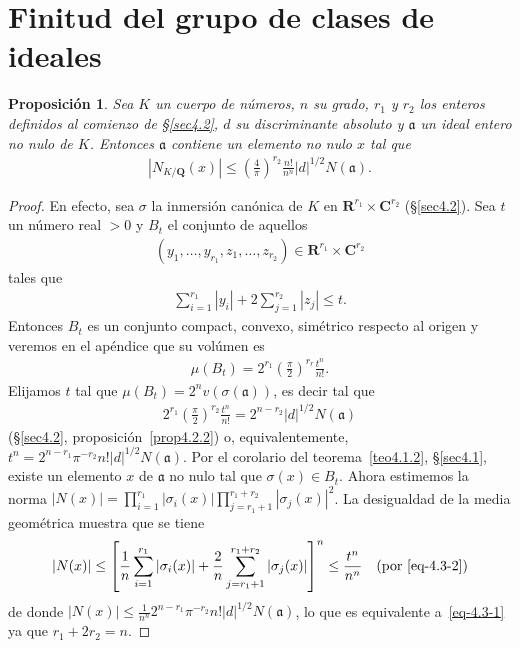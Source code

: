 \documentclass[oneside,bibtotoc,leqno,spanish]{amsbook}
\newcommand{\RR}{\mathbf{R}}
\newcommand{\QQ}{\mathbf{Q}}
\newcommand{\CC}{\mathbf{C}}
\newcommand{\idl}[1]{\mathfrak{#1}}
\newcommand{\QED}{}%
\newcommand{\abs}[1]{\left\lvert#1\right\rvert}
\numberwithin{equation}{section}
\theoremstyle{defi}
\theoremstyle{note}
\newtheorem{proposition}{Proposici\'on}
\theoremstyle{rem}
\numberwithin{theorem}{section}
\numberwithin{proposition}{section}
\numberwithin{definition}{section}
\numberwithin{lemma}{section}
\numberwithin{corollary}{section}
\numberwithin{example}{section}
\numberwithin{footnote}{section}%
\begin{document}
\section{Finitud del grupo de clases de ideales}\label{sec4.3}

\begin{proposition}\label{prop4.3.1}
Sea $K$ un cuerpo de n\'umeros, $n$ su grado, $r_{1}$ y $r_{2}$ los enteros definidos al comienzo de
\S\ref{sec4.2}, $d$ su discriminante absoluto y $\idl{a}$ un ideal entero no nulo de $K$. Entonces $\idl{a}$
contiene un elemento no nulo $x$ tal que
\begin{gather}\label{eq-4.3-1}
\abs{N_{K/\QQ}(x)}\leq\left(\frac{4}{\pi}\right)^{r_{2}}\frac{n!}{n^{n}}\abs{d}^{1/2}N(\idl{a}).
\end{gather}
\end{proposition}

\begin{proof}
En efecto, sea $\sigma$ la inmersi\'on can\'onica de $K$ en $\RR^{r_{1}}\times\CC^{r_{2}}$ (\S\ref{sec4.2}).
Sea $t$ un n\'umero real $>0$ y $B_{t}$ el conjunto de aquellos
\begin{gather*}
(y_{1},\dots,y_{r_{1}},z_{1},\dots,z_{r_{2}})\in\RR^{r_{1}}\times\CC^{r_{2}}
\end{gather*}
tales que
\begin{gather}\label{eq-4.3-2}
\sum_{i=1}^{r_{1}}\abs{y_{i}}+2\sum_{j=1}^{r_{2}}\abs{z_{j}}\leq t.
\end{gather}
Entonces $B_{t}$ es un conjunto compact, convexo, sim\'etrico respecto al origen y veremos en el ap\'endice
que su vol\'umen es
\begin{gather}
\mu(B_{t}) = 2^{r_{1}}\left(\frac{\pi}{2}\right)^{r_{r}}\frac{t^{n}}{n!}.
\end{gather}
Elijamos $t$ tal que $\mu(B_{t}) = 2^{n}v(\sigma(\idl{a}))$, es decir tal que
\begin{gather*}
2^{r_{1}}\left(\frac{\pi}{2}\right)^{r_{2}}\frac{t^{n}}{n!} = 2^{n-r_{2}}\abs{d}^{1/2}N(\idl{a})
\end{gather*}
(\S\ref{sec4.2}, proposici\'on~\ref{prop4.2.2}) o, equivalentemente, $t^{n} = 2^{n-r_{1}}\pi^{-r_{2}}n!\abs{d}^{1/2}N(\idl{a})$.
Por el corolario del teorema~\ref{teo4.1.2}, \S\ref{sec4.1},
existe un elemento $x$ de $\idl{a}$ no nulo tal que $\sigma(x)\in B_{t}$. 
Ahora estimemos la norma $\abs{N(x)} = \prod_{i=1}^{r_{1}}\abs{\sigma_{i}(x)}\prod_{j=r_{1}+1}^{r_{1}+r_{2}}\abs{\sigma_{j}(x)}^{2}$.
La desigualdad de la media geom\'etrica muestra que se tiene
\begin{gather*}
\abs{N(x)}\leq\left[\frac{1}{n}\sum_{i=1}^{r_{1}}\abs{\sigma_{i}(x)}+\frac{2}{n}\sum_{j=r_{1}+1}^{r_{1}+r_{2}}
\abs{\sigma_{j}(x)}\right]^{n}\leq\frac{t^{n}}{n^{n}}\quad(\text{por~\eqref{eq-4.3-2}})
\end{gather*}
de donde $\abs{N(x)}\leq\frac{1}{n^{n}}2^{n-r_{1}}\pi^{-r_{2}}n!\abs{d}^{1/2}N(\idl{a})$, lo que es equivalente
a~\eqref{eq-4.3-1} ya que $r_{1}+2r_{2} = n$. \QED
\end{proof}
\end{document}
